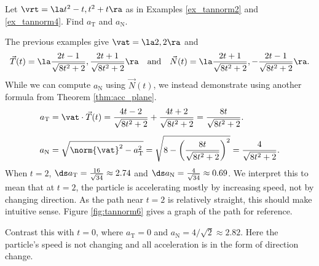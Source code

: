 {Let $\vrt=\la t^2-t,t^2+t\ra$ as in Examples \ref{ex_tannorm2} and \ref{ex_tannorm4}. Find $a_\text{T}$ and $a_\text{N}$.}
{The previous examples give $\vat = \la 2,2\ra$ and
$$\vec T(t) = \la \frac{2t-1}{\sqrt{8t^2+2}},\frac{2t+1}{\sqrt{8t^2+2}}\ra \quad \text{and}\quad \vec N(t) = \la \frac{2t+1}{\sqrt{8t^2+2}},-\frac{2t-1}{\sqrt{8t^2+2}}\ra.$$
While we can compute $a_\text{N}$ using $\vec N(t)$, we instead demonstrate using another formula from Theorem \ref{thm:acc_plane}.
\begin{align*}
a_\text{T} &= \vat\cdot\vec T(t) = \frac{4t-2}{\sqrt{8t^2+2}}+\frac{4t+2}{\sqrt{8t^2+2}} = \frac{8t}{\sqrt{8t^2+2}}.\\
a_\text{N} &= \sqrt{\norm{\vat}^2-a_\text{T}^2} = \sqrt{8-\left(\frac{8t}{\sqrt{8t^2+2}}\right)^2}=\frac{4}{\sqrt{8t^2+2}}\rule{0pt}{25pt}.
\end{align*}
When $t=2$, $\ds a_\text{T} = \frac{16}{\sqrt{34}}\approx 2.74$ and $\ds a_\text{N} = \frac{4}{\sqrt{34}} \approx 0.69$. We interpret this to mean that at $t=2$, the particle is accelerating mostly by increasing speed, not by changing direction. As the path near $t=2$ is relatively straight, this should make intuitive sense. Figure \ref{fig:tannorm6} gives a graph of the path for reference.

Contrast this with $t=0$, where $a_\text{T} = 0$ and $a_\text{N} = 4/\sqrt{2}\approx 2.82$. Here the particle's speed is not changing and all acceleration is in the form of direction change.
}\\

